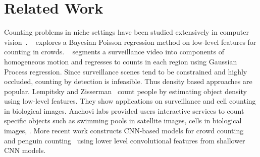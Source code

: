\documentclass[10pt,twocolumn,letterpaper]{article}
\begin{document}
\section{Related Work}\label{sec:rel_work}




\begin{comment}
\paragraph{Object Detection:} There has been a lot of progress on the problem of object detection in recent years~
SOTA in Object Detection
\begin{itemize}
\item RCNN uses object proposals to guide search of objects. It solves a classification problem at each object proposal to detect objects
\item Fast RCNN improves upon RCNN by implementing the pipeline in one CNN forward pass using ROI-pooling 
\item Faster RCNN integrates object proposal search with detection, and does end to end training
\item In contrast to these works, we are interested in counting, not precise localization
\item We find that one can do better counting using these methods by settling for worse localization 
\end{itemize}
\end{comment}

Counting problems in niche settings have been studied extensively in computer vision~\cite{Zhang2015,Segui2015,Chan2009BayesianCounting,Lempitsky2010}. ~\cite{Chan2009BayesianCounting} explores a Bayesian Poisson regression method on low-level features for counting in crowds. ~\cite{Chan2008PrivacyTracking} segments a surveillance video into components of homogeneous motion and regresses to counts in each region using Gaussian Process regression. Since surveillance scenes tend to be constrained and highly occluded, counting by detection is infeasible. Thus density based approaches are popular. Lempitsky and Zisserman~\cite{Lempitsky2010} count people by estimating object density using low-level features. They show applications on surveillance and cell counting in biological images. Anchovi labs provided users interactive services to count specific objects such as swimming pools in satellite images, cells in biological images, \etc. More recent work constructs CNN-based models for crowd counting~\cite{Zhang2015,onoro2016} and penguin counting~\cite{Arteta16} using lower level convolutional features from shallower CNN models.
\end{document}
